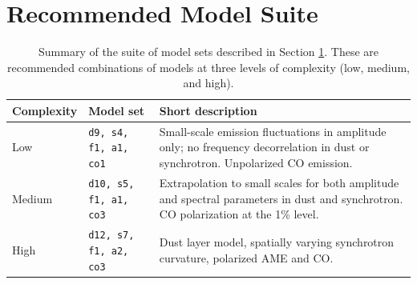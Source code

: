 \documentclass[twocolumn]{aastex631}
\newcommand{\giuse}[1]{\textcolor{orange}{(GP: #1)}}
\begin{document}



\section{Recommended Model Suite}\label{sec:modelsuite}

\begin{table}
    \centering
    \begin{tabular}{p{} p{} p{}}
    
    \toprule 
    Complexity & Model set & Short description \\
    \midrule
    Low  & \texttt{d9, s4, f1, a1, co1} & Small-scale emission fluctuations in amplitude only; no frequency decorrelation in dust or synchrotron. Unpolarized CO emission.   \\
    Medium  & \texttt{d10, s5, f1, a1, co3} & Extrapolation to small scales for both amplitude and spectral parameters in dust and synchrotron. CO polarization at the 1\% level.  \\
    High  & \texttt{d12, s7, f1, a2, co3} & Dust layer model, spatially varying synchrotron curvature, polarized AME and CO.  \\
   
   \bottomrule
    \end{tabular}
    \caption{Summary of the suite of model sets described in Section \ref{sec:modelsuite}. These are recommended combinations of models at three levels of complexity (low, medium, and high).  }
    \label{tab:modelsuite}
\end{table}
\end{document}

